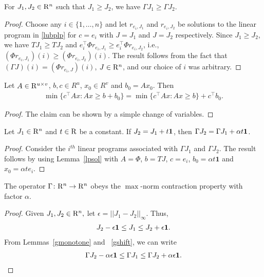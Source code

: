 \begin{lemma}\label{gmonotone}
For $J_1, J_2\in \mathrm{R}^n$ such that $J_1\geq J_2$, we have $\Gamma J_1\geq \Gamma J_2$.
\end{lemma}
\begin{proof}
Choose any $i\in \{1,\ldots,n\}$ and let $r_{e_i,J_1}$ and $r_{e_i,J_2}$ be solutions to the linear program in \eqref{lubplp} for $c=e_i$ with $J=J_1$ and $J=J_2$ respectively. Since $J_1\geq J_2$, we have $TJ_1\geq TJ_2$ and $e_i^\top \Phi r_{e_i,J_1} \geq e_i^\top \Phi r_{e_i,J_2}$, i.e., $(\Phi r_{e_i,J_1})(i)\geq (\Phi r_{e_i,J_2})(i)$. The result follows from the fact that $(\Gamma J)(i)=(\Phi r_{e_i,J})(i)$, $J\in \mathrm{R}^n$, and our choice of $i$ was arbitrary.
\end{proof}
\begin{lemma}\label{lpsol}
Let $A\in \mathrm{R}^{u\times v}$, $b,c\in R^u$, $x_0 \in R^v$ and $b_0=Ax_0$. Then
\begin{align}
\min\{c^\top Ax:Ax\geq b+b_0\} =\min\{c^\top Ax:Ax\geq b\}+c^\top b_0.
\end{align}
\end{lemma}
\begin{proof}
The claim can be shown by a simple change of variables.
\end{proof}
\begin{lemma}\label{gshift}
Let $J_1\in \mathrm{R}^n$ and $t\in \mathrm{R}$ be a constant. If $J_2=J_1+t\mathbf{1}$, then $\Gamma J_2=\Gamma J_1+\alpha t\mathbf{1}$.
\end{lemma}
\begin{proof}
Consider the $i^{th}$ linear programs associated with $\Gamma J_1$ and $\Gamma J_2$. The result follows by using Lemma~\ref{lpsol} with $A=\Phi$, $b=TJ$, $c=e_i$, $b_0=\alpha t\mathbf{1}$ and $x_0=\alpha t e_i$.
\end{proof}
\begin{theorem}\label{gmaxcontra}
The operator $\Gamma  \colon \mathrm{R}^n\rightarrow \mathrm{R}^n$ obeys the $\max$-norm contraction property with factor $\alpha$.
\end{theorem}
\begin{proof}
Given $J_1,J_2\in \mathrm{R}^n,$ let $\epsilon=||J_1-J_2||_\infty$. Thus,
\begin{align}\label{ineq}
J_2-\epsilon\one\leq J_1\leq J_2+\epsilon \one.
\end{align}
From Lemmas~\ref{gmonotone} and ~\ref{gshift}, we can write
\begin{align}\label{ineq}
\Gamma J_2-\alpha \epsilon\one\leq \Gamma J_1\leq \Gamma J_2+\alpha \epsilon\one.
\end{align}
\end{proof}
